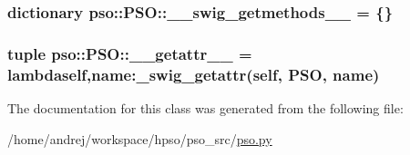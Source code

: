 \hypertarget{classpso_1_1PSO_db5792f0b3f1752edef791c69fb42812}{
\subsubsection{\setlength{\rightskip}{0pt plus 5cm}dictionary {\bf pso::PSO::\_\-\_\-swig\_\-getmethods\_\-\_\-} = \{\}}}
\label{classpso_1_1PSO_db5792f0b3f1752edef791c69fb42812}


\hypertarget{classpso_1_1PSO_672d2392549b45dd0bbbabbfd77a9a18}{
\subsubsection{\setlength{\rightskip}{0pt plus 5cm}tuple {\bf pso::PSO::\_\-\_\-getattr\_\-\_\-} = lambdaself,name:\_\-swig\_\-getattr(self, {\bf PSO}, name)}}
\label{classpso_1_1PSO_672d2392549b45dd0bbbabbfd77a9a18}




The documentation for this class was generated from the following file:\begin{CompactItemize}
\item 
/home/andrej/workspace/hpso/pso\_\-src/\hyperlink{pso_8py}{pso.py}\end{CompactItemize}
